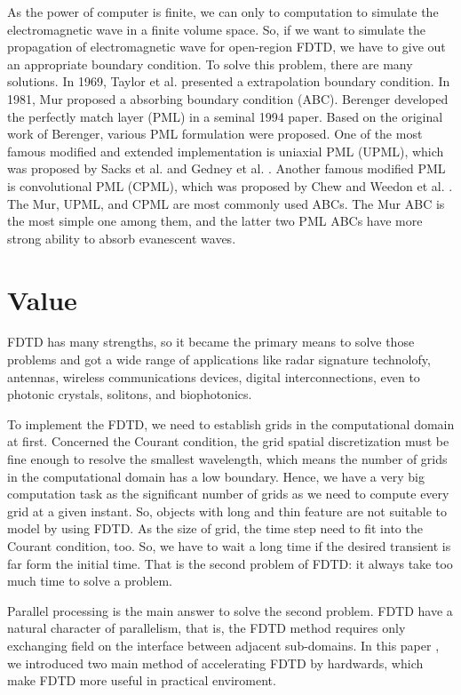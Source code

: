 As the power of computer is finite, we can only to computation to simulate the electromagnetic wave in a finite volume space. So, if we want to simulate the propagation of electromagnetic wave for open-region FDTD, we have to give out an appropriate boundary condition. To solve this problem, there are many solutions. In 1969, Taylor\cite{taylor} et al. presented a extrapolation boundary condition. In 1981, Mur\cite{mur1981absorbing} proposed a absorbing boundary condition (ABC). Berenger \cite{mur1981absorbing} developed the perfectly match layer (PML) in a seminal 1994 paper. Based on the original work of Berenger, various PML formulation were proposed. One of the most famous modified and extended implementation is uniaxial PML (UPML), which was proposed by Sacks et al. \cite{sacks} and Gedney et al. \cite{gedney}. Another famous modified PML is convolutional PML (CPML), which was proposed by Chew and Weedon et al. \cite{gedney}. The Mur, UPML, and CPML are most commonly used ABCs. The Mur ABC is the most simple one among them, and the latter two PML ABCs have more strong ability to absorb evanescent waves.

\section{Value}
 FDTD has many strengths, so it became the primary means to solve those problems and got a wide range of applications like radar signature technolofy, antennas, wireless communications devices, digital interconnections, even to photonic crystals, solitons, and biophotonics.

To implement the FDTD, we need to establish grids in the computational domain at first. Concerned the Courant condition, the grid spatial discretization must be fine enough to resolve the smallest wavelength, which means the number of grids in the computational domain has a low boundary. Hence, we have a very big computation task as the significant number of grids as we need to compute every grid at a given instant. So, objects with long and thin feature are not suitable to model by using FDTD. As the size of grid, the time step need to fit into the Courant condition, too. So, we have to wait a long time if the desired transient is far form the initial time. That is the second problem of FDTD: it always take too much time to solve a problem.

Parallel processing is the main answer to solve the second problem. FDTD have a natural character of parallelism, that is, the FDTD method requires only exchanging field on the interface between adjacent sub-domains. In this paper , we introduced two main method of accelerating FDTD by hardwards, which make FDTD more useful in practical enviroment.


